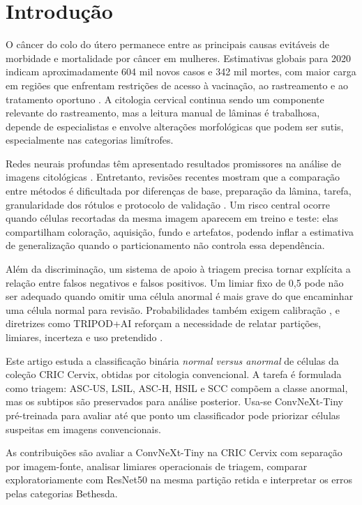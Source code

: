 \section{Introdução}

O câncer do colo do útero permanece entre as principais causas evitáveis de
morbidade e mortalidade por câncer em mulheres. Estimativas globais para 2020
indicam aproximadamente 604 mil novos casos e 342 mil mortes, com maior carga
em regiões que enfrentam restrições de acesso à vacinação, ao rastreamento e ao
tratamento oportuno \cite{singh2023global}. A citologia cervical continua sendo
um componente relevante do rastreamento, mas a leitura manual de lâminas é
trabalhosa, depende de especialistas e envolve alterações morfológicas que
podem ser sutis, especialmente nas categorias limítrofes.

Redes neurais profundas têm apresentado resultados promissores na análise de
imagens citológicas \cite{jiang2023systematic,xu2023cervical}. Entretanto,
revisões recentes mostram que a comparação entre métodos é dificultada por
diferenças de base, preparação da lâmina, tarefa, granularidade dos rótulos e
protocolo de validação \cite{fang2024systematic}. Um risco central ocorre
quando células recortadas da mesma imagem aparecem em treino e teste: elas
compartilham coloração, aquisição, fundo e artefatos, podendo inflar a
estimativa de generalização quando o particionamento não controla essa
dependência.

Além da discriminação, um sistema de apoio à triagem precisa tornar explícita a
relação entre falsos negativos e falsos positivos. Um limiar fixo de 0,5 pode
não ser adequado quando omitir uma célula anormal é mais grave do que
encaminhar uma célula normal para revisão. Probabilidades também exigem
calibração \cite{guo2017calibration}, e diretrizes como TRIPOD+AI reforçam a
necessidade de relatar partições, limiares, incerteza e uso pretendido
\cite{collins2024tripod}.

Este artigo estuda a classificação binária \emph{normal versus anormal} de
células da coleção CRIC Cervix, obtidas por citologia convencional. A tarefa é
formulada como triagem: ASC-US, LSIL, ASC-H, HSIL e SCC compõem a classe
anormal, mas os subtipos são preservados para análise posterior. Usa-se
ConvNeXt-Tiny pré-treinada \cite{liu2022convnext} para avaliar até que ponto um
classificador pode priorizar células suspeitas em imagens convencionais.

As contribuições são avaliar a ConvNeXt-Tiny na CRIC Cervix com separação por
imagem-fonte, analisar limiares operacionais de triagem, comparar
exploratoriamente com ResNet50 na mesma partição retida e interpretar os erros
pelas categorias Bethesda.
